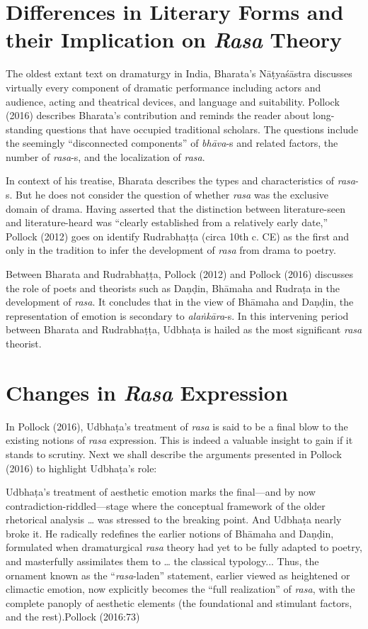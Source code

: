 \section*{Differences in Literary Forms and their Implication on \textsl{Rasa} Theory}

The oldest extant text on dramaturgy in India, Bharata’s Nāṭyaśāstra discusses virtually every component of dramatic performance including actors and audience, acting and theatrical devices, and language and suitability. Pollock (2016) describes Bharata’s contribution and reminds the reader about long-standing questions that have occupied traditional scholars. The questions include the seemingly “disconnected components” of \textsl{bhāva}-s and related factors, the number of \textsl{rasa}-s, and the localization of \textsl{rasa}. 

In context of his treatise, Bharata describes the types and characteristics of \textsl{rasa}-s. But he does not consider the question of whether \textsl{rasa} was the exclusive domain of drama. Having asserted that the distinction between literature-seen and literature-heard was “clearly established from a relatively early date,” Pollock (2012) goes on identify Rudrabhaṭṭa (circa 10th c. CE) as the first and only in the tradition to infer the development of \textsl{rasa} from drama to poetry. 

Between Bharata and Rudrabhaṭṭa, Pollock (2012) and Pollock (2016) discusses the role of poets and theorists such as Daṇḍin, Bhāmaha and Rudraṭa in the development of \textsl{rasa}. It concludes that in the view of Bhāmaha and Daṇḍin, the representation of emotion is secondary to \textsl{alaṅkāra}-s. In this intervening period between Bharata and Rudrabhaṭṭa, Udbhaṭa is hailed as the most significant \textsl{rasa} theorist. 

\section*{Changes in \textsl{Rasa} Expression}

In Pollock (2016), Udbhaṭa’s treatment of \textsl{rasa} is said to be a final blow to the existing notions of \textsl{rasa} expression. This is indeed a valuable insight to gain if it stands to scrutiny. Next we shall describe the arguments presented in Pollock (2016) to highlight Udbhaṭa’s role: 

\begin{myquote}
Udbhaṭa’s treatment of aesthetic emotion marks the final—and by now contradiction-riddled—stage where the conceptual framework of the older rhetorical analysis … was stressed to the breaking point. And Udbhaṭa nearly broke it. He radically redefines the earlier notions of Bhāmaha and Daṇḍin, formulated when dramaturgical \textsl{rasa} theory had yet to be fully adapted to poetry, and masterfully assimilates them to … the classical typology... Thus, the ornament known as the “\textsl{rasa}-laden” statement, earlier viewed as heightened or climactic emotion, now explicitly becomes the “full realization” of \textsl{rasa}, with the complete panoply of aesthetic elements (the foundational and stimulant factors, and the rest).\hfill Pollock (2016:73)
\end{myquote}

